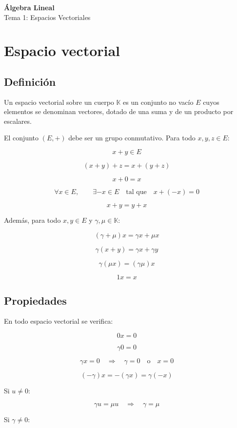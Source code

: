 \documentclass[11pt,a4paper]{article}
\newcommand{\K}{\mathbb{K}}
\begin{document}
\begin{center}
	{\LARGE\bfseries Álgebra Lineal}\\[0.4em]
	{\Large Tema 1: Espacios Vectoriales}
\end{center}

\tableofcontents
\newpage

\section{Espacio vectorial}

\subsection{Definición}

Un espacio vectorial sobre un cuerpo $\K$ es un conjunto no vacío $E$ cuyos elementos se denominan vectores, dotado de una suma y de un producto por escalares.

El conjunto $(E,+)$ debe ser un grupo conmutativo. Para todo $x,y,z\in E$:

\[
x+y\in E
\]

\[
(x+y)+z=x+(y+z)
\]

\[
x+0=x
\]

\[
\forall x\in E,\qquad \exists -x\in E
\quad\text{tal que}\quad
x+(-x)=0
\]

\[
x+y=y+x
\]

Además, para todo $x,y\in E$ y $\gamma,\mu\in\K$:

\[
(\gamma+\mu)x=\gamma x+\mu x
\]

\[
\gamma(x+y)=\gamma x+\gamma y
\]

\[
\gamma(\mu x)=(\gamma\mu)x
\]

\[
1x=x
\]

\subsection{Propiedades}

En todo espacio vectorial se verifica:

\[
0x=0
\]

\[
\gamma 0=0
\]

\[
\gamma x=0
\quad\Longrightarrow\quad
\gamma=0
\quad\text{o}\quad
x=0
\]

\[
(-\gamma)x=-(\gamma x)=\gamma(-x)
\]

Si $u\neq0$:

\[
\gamma u=\mu u
\quad\Longrightarrow\quad
\gamma=\mu
\]

Si $\gamma\neq0$:
\end{document}
